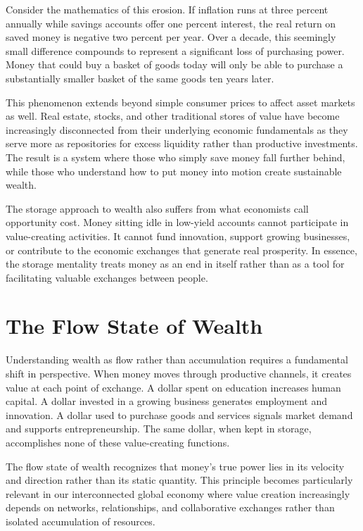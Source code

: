 \documentclass[
  Letterpaper,
]{scrbook}
\begin{document}
Consider the mathematics of this erosion. If inflation runs at three
percent annually while savings accounts offer one percent interest, the
real return on saved money is negative two percent per year. Over a
decade, this seemingly small difference compounds to represent a
significant loss of purchasing power. Money that could buy a basket of
goods today will only be able to purchase a substantially smaller basket
of the same goods ten years later.

This phenomenon extends beyond simple consumer prices to affect asset
markets as well. Real estate, stocks, and other traditional stores of
value have become increasingly disconnected from their underlying
economic fundamentals as they serve more as repositories for excess
liquidity rather than productive investments. The result is a system
where those who simply save money fall further behind, while those who
understand how to put money into motion create sustainable wealth.

The storage approach to wealth also suffers from what economists call
opportunity cost. Money sitting idle in low-yield accounts cannot
participate in value-creating activities. It cannot fund innovation,
support growing businesses, or contribute to the economic exchanges that
generate real prosperity. In essence, the storage mentality treats money
as an end in itself rather than as a tool for facilitating valuable
exchanges between people.

\section{The Flow State of Wealth}\label{the-flow-state-of-wealth}

Understanding wealth as flow rather than accumulation requires a
fundamental shift in perspective. When money moves through productive
channels, it creates value at each point of exchange. A dollar spent on
education increases human capital. A dollar invested in a growing
business generates employment and innovation. A dollar used to purchase
goods and services signals market demand and supports entrepreneurship.
The same dollar, when kept in storage, accomplishes none of these
value-creating functions.

The flow state of wealth recognizes that money's true power lies in its
velocity and direction rather than its static quantity. This principle
becomes particularly relevant in our interconnected global economy where
value creation increasingly depends on networks, relationships, and
collaborative exchanges rather than isolated accumulation of resources.
\end{document}

